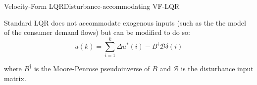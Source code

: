 \begin{frame}{Velocity-Form LQR}{Disturbance-accommodating VF-LQR}

	Standard LQR does not accommodate exogenous inputs (such as the the model of the consumer demand flows) but can be modified to do so:
	\begin{equation}
		u(k) = \sum_{i=1}^{k} \Delta{u}^*(i) - B^\dagger \mathcal{B}\delta(i)
	\end{equation}
	
	where $B^\dagger$ is the Moore-Penrose pseudoinverse of $B$ and $\mathcal{B}$ is the disturbance input matrix.
\end{frame}
